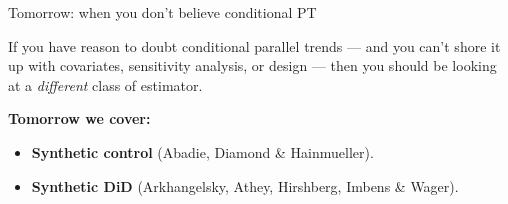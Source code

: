\documentclass[aspectratio=169,12pt,t]{beamer}
\begin{document}
\begin{frame}{Tomorrow: when you don't believe conditional PT}
\vspace{0.6cm}

If you have reason to doubt conditional parallel trends --- and you can't shore it up with covariates, sensitivity analysis, or design --- then you should be looking at a \textit{different} class of estimator.

\vspace{0.6cm}

\textbf{Tomorrow we cover:}
\begin{itemize}\setlength\itemsep{6pt}
  \item \textbf{Synthetic control} \;(Abadie, Diamond \& Hainmueller).
  \item \textbf{Synthetic DiD} \;(Arkhangelsky, Athey, Hirshberg, Imbens \& Wager).
\end{itemize}

\vspace{0.7cm}
\end{frame}
\end{document}
